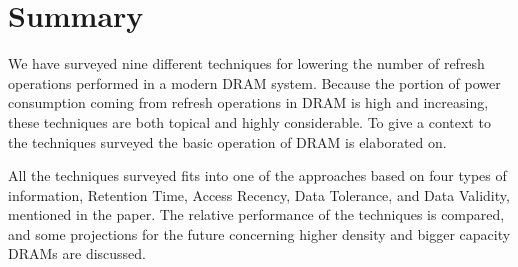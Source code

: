 \section{Summary} 
\label{sec:sum}
We have surveyed nine different techniques for lowering the number of refresh operations performed in a modern DRAM system. Because the portion of power consumption coming from refresh operations in DRAM is high and increasing, these techniques are both topical and highly considerable. To give a context to the techniques surveyed the basic operation of DRAM is elaborated on. 

All the techniques surveyed fits into one of the approaches based on four types of information, Retention Time, Access Recency, Data Tolerance, and Data Validity, mentioned in the paper. The relative performance of the techniques is compared, and some projections for the future concerning higher density and bigger capacity DRAMs are discussed.